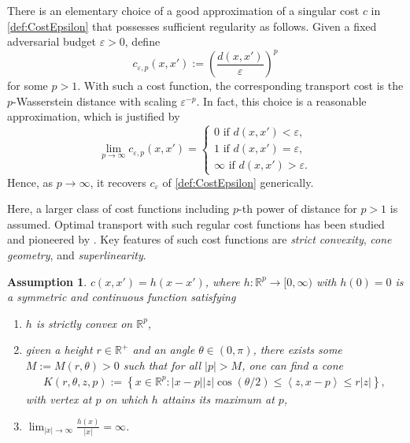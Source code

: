 \documentclass{amsart}
\theoremstyle{plain}
\numberwithin{equation}{section}\newtheorem{theorem}{Theorem}[section]
\newtheorem{assumption}[theorem]{Assumption}
\theoremstyle{remark}
\newcommand{\R}{\mathbb{R}}
\begin{document}
There is an elementary choice of a good approximation of a singular cost $c$ in \eqref{def:CostEpsilon} that possesses sufficient regularity as follows. Given a fixed adversarial budget $\varepsilon > 0$, define
\[
    c_{\varepsilon, p}(x,x'):=\left( \frac{d(x,x')}{ \varepsilon} \right)^p
\]
for some $p > 1$. With such a cost function, the corresponding transport cost is the $p$-Wasserstein distance with scaling $\varepsilon^{-p}$. In fact, this choice is a reasonable approximation, which is justified by 
\[
    \lim_{p \to \infty } c_{\varepsilon, p}(x,x') = \begin{cases}
        0 \text{ if $d(x,x') < \varepsilon$,}\\
        1 \text{ if $d(x,x') = \varepsilon$,}\\
        \infty \text{ if $d(x,x') > \varepsilon$.}
    \end{cases}
\]
Hence, as $p \to \infty$, it recovers $c_\varepsilon$ of \eqref{def:CostEpsilon} generically.





Here, a larger class of cost functions including $p$-th power of distance for $p >1$ is assumed. Optimal transport with such regular cost functions has been studied and pioneered by \citet{gangbo1996geometry}. Key features of such cost functions are \emph{strict convexity}, \emph{cone geometry}, and \emph{superlinearity}. 






\begin{assumption}\label{assumption: strict convexity of cost function}
$c(x,x')=h(x-x')$, where $h:\mathbb{R}^p \rightarrow [0, \infty)$ with $h(0)=0$ is a symmetric and continuous function satisfying
\begin{enumerate}
	\item[(A1)] $h$ is strictly convex on $\mathbb{R}^p $,
	\item[(A2)] given a height $r\in \R^+$ and an angle $\theta \in (0,\pi) $, there exists some $M:=M(r, \theta)>0$ such that for all $|p |>M$, one can find a cone 
	\begin{align*}
		K(r, \theta, z,p):=\left\lbrace x\in \mathbb{R}^p  : | x-p|| z|\cos(\theta/2)\leq \left< z,x-p \right>\leq  r| z| \right\rbrace,
	\end{align*}
	with vertex at $p$ on which $h$ attains its maximum at $p$,
	\item[(A3)] $\lim_{|x | \rightarrow \infty}\frac{h(x)}{|x | }= \infty $.
\end{enumerate}    
\end{assumption}
\end{document}
